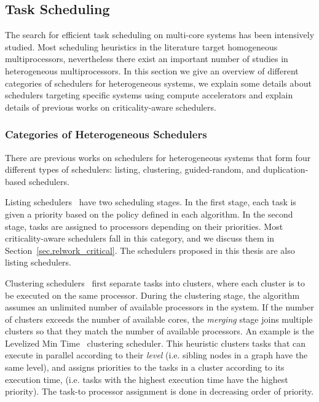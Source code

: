 \subsection{Task Scheduling}

The search for efficient task scheduling on multi-core systems has been intensively studied. 
Most scheduling heuristics in the literature target homogeneous multiprocessors, nevertheless there exist an important number of studies in heterogeneous multiprocessors. 
In this section we give an overview of different categories of schedulers for heterogeneous systems, we explain some details about schedulers targeting specific systems using compute accelerators and explain details of previous works on criticality-aware schedulers.


\subsubsection{Categories of Heterogeneous Schedulers}

There are previous works on schedulers for heterogeneous systems that form four different types of schedulers: listing, clustering, guided-random, and duplication-based schedulers.

Listing schedulers~\cite{List, DCPS, LDCP, HEFT, CrPathDup} have two scheduling stages. In the first stage, each task is given a priority based on the policy defined in each algorithm. In the second stage, tasks are assigned to processors depending on their priorities. Most criticality-aware schedulers fall in this category, and we discuss them in Section~\ref{sec.relwork_critical}. The schedulers proposed in this thesis are also  listing schedulers.

Clustering schedulers~\cite{Hypertool, DSC, DCPS, Hetero95} first separate tasks into clusters, where each cluster is to be executed on the same processor. During the clustering stage, the algorithm assumes an unlimited number of available processors in the system. If the number of clusters exceeds the number of available cores, the \textit{merging} stage joins multiple clusters so that they match the number of available processors. An example is the Levelized Min Time~\cite{Hetero95} clustering scheduler. This heuristic clusters tasks that can execute in parallel according to their \textit{level} (i.e. sibling nodes in a graph have the same level), and assigns priorities to the tasks in a cluster according to its execution time, (i.e. tasks with the highest execution time have the highest priority). The task-to processor assignment is done in decreasing order of priority.

